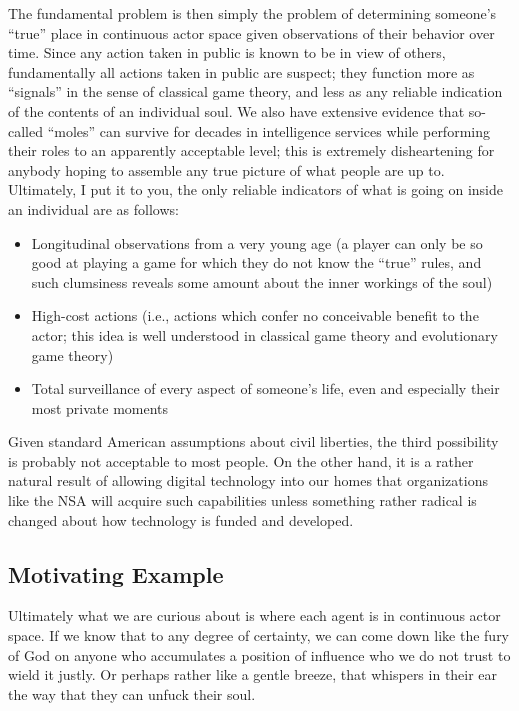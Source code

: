 \documentclass{article}
\begin{document}
The fundamental problem is then simply the problem of determining
someone's ``true'' place in continuous actor space given observations
of their behavior over time. Since any action taken in public is known
to be in view of others, fundamentally all actions taken in public are
suspect; they function more as ``signals'' in the sense of classical
game theory, and less as any reliable indication of the contents of an
individual soul. We also have extensive evidence that so-called
``moles'' can survive for decades in intelligence services while
performing their roles to an apparently acceptable level; this is
extremely disheartening for anybody hoping to assemble any true
picture of what people are up to. Ultimately, I put it to you, the
only reliable indicators of what is going on inside an individual are as follows:
\begin{itemize}
  \item Longitudinal observations from a very young age (a player can
    only be so good at playing a game for which they do not know the
    ``true'' rules, and such clumsiness reveals some amount about the
    inner workings of the soul)
  \item High-cost actions (i.e., actions which confer no conceivable
    benefit to the actor; this idea is well understood in classical
    game theory and evolutionary game theory)
  \item Total surveillance of every aspect of someone's life, even and
    especially their most private moments
\end{itemize}
Given standard American assumptions about civil liberties, the third
possibility is probably not acceptable to most people. On the other
hand, it is a rather natural result of allowing digital technology
into our homes that organizations like the NSA will acquire such
capabilities unless something rather radical is changed about how
technology is funded and developed.

\subsection{Motivating Example}

Ultimately what we are curious about is where each agent is in
continuous actor space. If we know that to any degree of certainty, we
can come down like the fury of God on anyone who accumulates a
position of influence who we do not trust to wield it justly. Or
perhaps rather like a gentle breeze, that whispers in their ear the
way that they can unfuck their soul.
\end{document}
